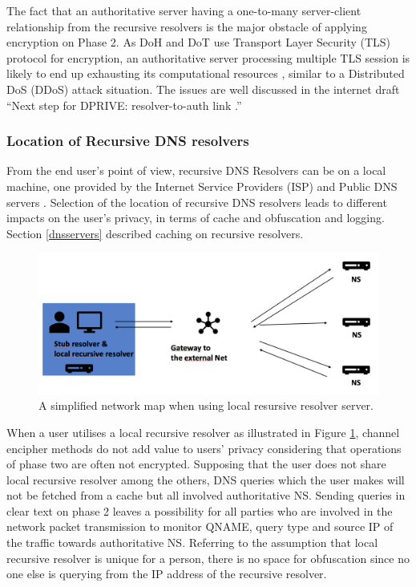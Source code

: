 \documentclass[a4paper,12pt]{article}
\begin{document}
The fact that an authoritative server having a one-to-many server-client relationship from the recursive resolvers is the major obstacle of applying encryption on Phase 2.
As DoH \cite{rfc8484} and DoT \cite{hu2016specification} use Transport Layer Security (TLS) protocol \cite{rfc7858} for encryption, an authoritative server processing multiple TLS session is likely to end up exhausting its computational resources \cite{bhople2012server}, similar to a Distributed DoS (DDoS) attack situation. The issues are well discussed in the internet draft ``Next step for DPRIVE: resolver-to-auth link \cite{I-D.bortzmeyer-dprive-step-2}.''

\subsubsection{Location of Recursive DNS resolvers}
From the end user's point of view, recursive DNS Resolvers can be on a local machine, one provided by the Internet Service Providers (ISP) and Public DNS servers \cite{van2018privacy}.
Selection of the location of recursive DNS resolvers leads to different impacts on the user's privacy, in terms of cache and obfuscation and logging. Section \ref{dnsservers} described caching on recursive resolvers.

\begin{figure}[ht!]
    \begin{center}
    \includegraphics*[width=0.6\columnwidth]{img/local-recursive}
    \end{center}
    \caption{A simplified network map when using local resursive resolver server.}
    \label{localrecursive}
\end{figure}
When a user utilises a local recursive resolver as illustrated in Figure \ref{localrecursive}, channel encipher methods do not add value to users' privacy considering that operations of phase two are often not encrypted.
Supposing that the user does not share local recursive resolver among the others, DNS queries which the user makes will not be fetched from a cache but all involved authoritative NS.
Sending queries in clear text on phase 2 leaves a possibility for all parties who are involved in the network packet transmission to monitor QNAME, query type and source IP of the traffic towards authoritative NS.
Referring to the assumption that local recursive resolver is unique for a person, there is no space for obfuscation since no one else is querying from the IP address of the recursive resolver.
\end{document}
